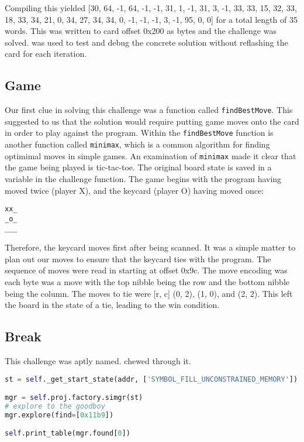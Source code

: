 Compiling this yielded [30, 64, -1, 64, -1, -1, 31, 1, -1, 31, 3, -1, 33, 33, 15, 32, 33, 18, 33, 34, 21, 0, 34, 27, 34, 34, 0, -1, -1, -1, 3, -1, 95, 0, 0] for a total length of 35 words. This was written to card offset 0x200 as bytes and the challenge was solved.
\angr was used to test and debug the concrete solution without reflashing the card for each iteration.

\subsection{Game}
Our first clue in solving this challenge was a function called \texttt{findBestMove}. This suggested to us that the solution would require putting game moves onto the card in order to play against the program. Within the \texttt{findBestMove} function is another function called \texttt{minimax}, which is a common algorithm for finding optimimal moves in simple games. An examination of \texttt{minimax} made it clear that the game being played is tic-tac-toe. The original board state is saved in a variable in the challenge function. The game begins with the program having moved twice (player X), and the keycard (player O) having moved once:

\begin{verbatim}
xx_
_o_
___
\end{verbatim}

Therefore, the keycard moves first after being scanned. It was a simple matter to plan out our moves to ensure that the keycard ties with the program. The sequence of moves were read in starting at offset 0x9c. The move encoding was each byte was a move with the top nibble being the row and the bottom nibble being the column. The moves to tie were [r, c] (0, 2), (1, 0), and (2, 2). This left the board in the state of a tie, leading to the win condition.

\subsection{Break}
This challenge was aptly named. \angr chewed through it.

\begin{lstlisting}[language=python]
st = self._get_start_state(addr, ['SYMBOL_FILL_UNCONSTRAINED_MEMORY'])

mgr = self.proj.factory.simgr(st)
# explore to the goodboy
mgr.explore(find=[0x11b9])

self.print_table(mgr.found[0])
\end{lstlisting}

